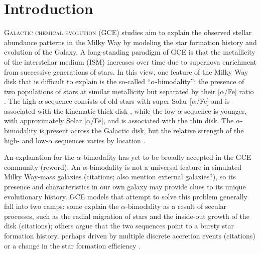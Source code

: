 \documentclass[twocolumn,twocolappendix,linenumbers]{aastex631}
\newcommand{\todo}[1]{{\color{red}#1}}
\newcommand{\aFe}{[$\alpha$/Fe]\xspace}
\begin{document}
% 

\section{Introduction}

\lettrine{G}{alactic chemical evolution} (GCE) studies aim to explain the observed stellar abundance patterns in the Milky Way by modeling the star formation history and evolution of the Galaxy. A long-standing paradigm of GCE is that the metallicity of the interstellar medium (ISM) increases over time due to supernova enrichment from successive generations of stars. In this view, one feature of the Milky Way disk that is difficult to explain is the so-called ``$\alpha$-bimodality'': the presence of two populations of stars at similar metallicity but separated by their \aFe ratio \citep[e.g.,][]{bensby_exploring_2014}. The high-$\alpha$ sequence consists of old stars \citep[$\gtrsim9$ Gyr;][]{pinsonneault_apokasc-3_2025} with super-Solar \aFe and is associated with the kinematic thick disk \citep[e.g.,][]{fuhrmann_nearby_1998}, while the low-$\alpha$ sequence is younger, with approximately Solar \aFe, and is associated with the thin disk. The $\alpha$-bimodality is present across the Galactic disk, but the relative strength of the high- and low-$\alpha$ sequences varies by location \citep{hayden_chemical_2015}. 

An explanation for the $\alpha$-bimodality has yet to be broadly accepted in the GCE community \todo{(reword)}. An $\alpha$-bimodality is not a universal feature in simulated Milky Way-mass galaxies \todo{(citations; also mention external galaxies?)}, so its presence and characteristics in our own galaxy may provide clues to its unique evolutionary history. GCE models that attempt to solve this problem generally fall into two camps: some explain the $\alpha$-bimodality as a result of secular processes, such as the radial migration of stars and the inside-out growth of the disk \todo{(citations)}; others argue that the two sequences point to a bursty star formation history, perhaps driven by multiple discrete accretion events \todo{(citations)} or a change in the star formation efficiency \citep[e.g.][]{conroy_birth_2022}.
\end{document}
